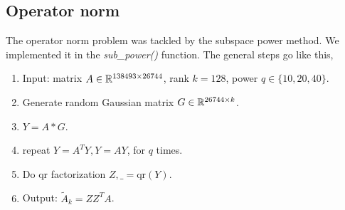 \subsection{Operator norm}
The operator norm problem was tackled by the subspace power method.
We implemented it in the \textit{sub\_power()} function.
The general steps go like this,
\begin{enumerate}
    \item Input: matrix $A\in {\mathbb{R}}^{138493\times 26744}$,
    rank $k=128$, power $q\in\{10,20,40\}$.
    \item Generate random Gaussian matrix $G\in{\mathbb{R}}^{26744\times k}$.
    \item $Y=A*G$.
    \item repeat $Y = A^T Y, Y=AY$, for $q$ times.\
    \item Do qr factorization $Z, \_ = \text{qr}(Y)$.
    \item Output: $\tilde{A}_k = Z Z^T A$.
\end{enumerate}
